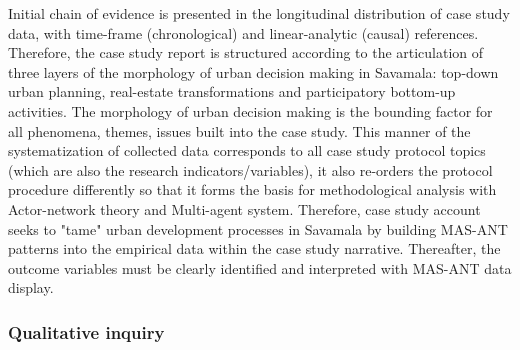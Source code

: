 \documentclass[11pt]{report}
\begin{document}
Initial chain of evidence is presented in the longitudinal distribution of case study data, with time-frame (chronological) and linear-analytic (causal) references. Therefore, the case study report is structured according to the articulation of three layers of the morphology of urban decision making in Savamala: top-down urban planning, real-estate transformations and participatory bottom-up activities. The morphology of urban decision making is the bounding factor for all phenomena, themes, issues built into the case study. This manner of the systematization of collected data corresponds to all case study protocol topics (which are also the research indicators/variables), it also re-orders the protocol procedure differently so that it forms the basis for methodological analysis with Actor-network theory and Multi-agent system. Therefore, case study account seeks to "tame" urban development processes in Savamala by building MAS-ANT patterns into the empirical data within the case study narrative. Thereafter, the outcome variables must be clearly identified and interpreted with MAS-ANT data display. 

\subsubsection{Qualitative inquiry}
\end{document}
